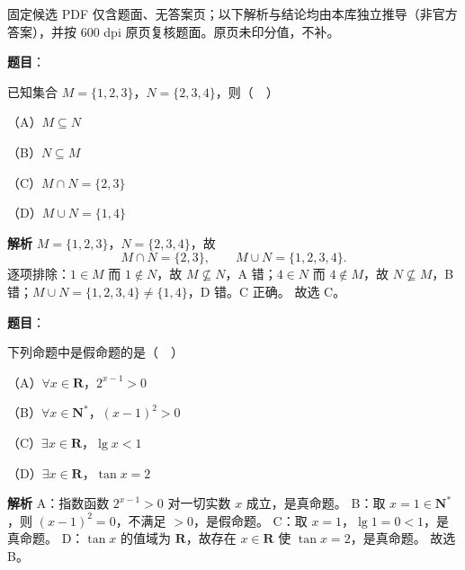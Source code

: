 \begin{gktip}
固定候选 PDF 仅含题面、无答案页；以下解析与结论均由本库独立推导（非官方答案），并按 600 dpi 原页复核题面。原页未印分值，不补。
\end{gktip}

\begin{answer}

\textbf{题目}：

已知集合 $M=\{1,2,3\}$，$N=\{2,3,4\}$，则（　）

（A）$M\subseteq N$

（B）$N\subseteq M$

（C）$M\cap N=\{2,3\}$

（D）$M\cup N=\{1,4\}$

\textbf{解析}
$M=\{1,2,3\}$，$N=\{2,3,4\}$，故
\nopagebreak[4]
\[M\cap N=\{2,3\},\qquad M\cup N=\{1,2,3,4\}.\]
逐项排除：$1\in M$ 而 $1\notin N$，故 $M\not\subseteq N$，A 错；$4\in N$ 而 $4\notin M$，故 $N\not\subseteq M$，B 错；$M\cup N=\{1,2,3,4\}\neq\{1,4\}$，D 错。C 正确。
故选 C。


\end{answer}
\begin{answer}

\textbf{题目}：

下列命题中是假命题的是（　）

（A）$\forall x\in\mathbf R$，$2^{x-1}>0$

（B）$\forall x\in\mathbf N^*$，$(x-1)^2>0$

（C）$\exists x\in\mathbf R$，$\lg x<1$

（D）$\exists x\in\mathbf R$，$\tan x=2$

\textbf{解析}
A：指数函数 $2^{x-1}>0$ 对一切实数 $x$ 成立，是真命题。
B：取 $x=1\in\mathbf N^*$，则 $(x-1)^2=0$，不满足 $>0$，是假命题。
C：取 $x=1$，$\lg1=0<1$，是真命题。
D：$\tan x$ 的值域为 $\mathbf R$，故存在 $x\in\mathbf R$ 使 $\tan x=2$，是真命题。
故选 B。


\end{answer}
